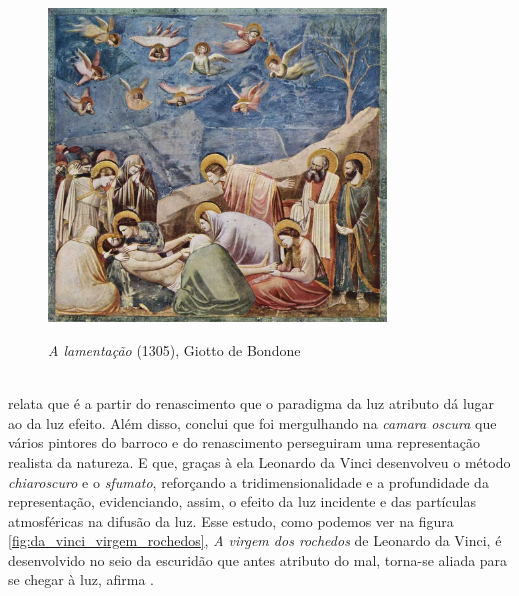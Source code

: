 \begin{figure}[H]
    \centering
    \caption{\textit{A lamentação} (1305), Giotto de Bondone}
	\vspace*{0,2cm}
    \includegraphics[width=0.8\textwidth]{./04-figuras/giotto_lamentacao}
    \label{fig:giotto_lamentacao}
\end{figure}
\vspace*{-0,9cm}
{\raggedright {}}\\

 relata que é a partir do renascimento que o paradigma da luz atributo dá lugar ao da luz efeito. Além disso, conclui que foi mergulhando na \textit{camara oscura} que vários pintores do barroco e do renascimento perseguiram uma representação realista da natureza. E que, graças à ela Leonardo da Vinci desenvolveu o método \textit{chiaroscuro} e o \textit{sfumato}, reforçando a tridimensionalidade e a profundidade da representação, evidenciando, assim, o efeito da luz incidente e das partículas atmosféricas na difusão da luz. Esse estudo,  como podemos ver na figura \ref{fig:da_vinci_virgem_rochedos}, \textit{A virgem dos rochedos} de Leonardo da Vinci, é desenvolvido no seio da escuridão que antes atributo do mal, torna-se aliada para se chegar à luz, afirma .

